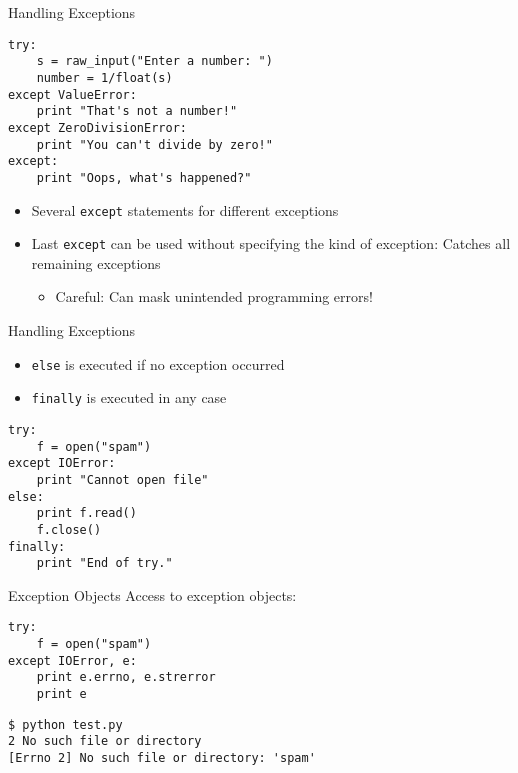 \begin{frame}[fragile]{Handling Exceptions}
\begin{lstlisting}[style=Python]
try:
    s = raw_input("Enter a number: ")
    number = 1/float(s)
except ValueError:
    print "That's not a number!"
except ZeroDivisionError:
    print "You can't divide by zero!"
except:
    print "Oops, what's happened?"
\end{lstlisting}
\begin{itemize}
\item Several \lstinline{except} statements for different exceptions
\item Last \lstinline{except} can be used without specifying the kind of exception: Catches all remaining exceptions
\begin{itemize}
\item Careful: Can mask unintended programming errors!
\end{itemize}
\end{itemize}
\end{frame}

\begin{frame}[fragile]{Handling Exceptions}
\begin{itemize}
\item \alert{\texttt{else}} is executed if no exception occurred
\item \alert{\texttt{finally}} is executed \alert{in any} case
\end{itemize}
\begin{lstlisting}[style=Python]
try:
    f = open("spam")
except IOError:
    print "Cannot open file"
else:
    print f.read()
    f.close()
finally:
    print "End of try."
\end{lstlisting}
\end{frame}

\begin{frame}[fragile]{Exception Objects}
Access to exception objects:
\begin{lstlisting}[style=Python]
try:
    f = open("spam")
except IOError, e:
    print e.errno, e.strerror
    print e
\end{lstlisting}
\begin{lstlisting}[style=Shell]
$ python test.py
2 No such file or directory
[Errno 2] No such file or directory: 'spam'
\end{lstlisting}%
\end{frame}

